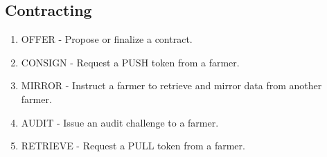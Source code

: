 \documentclass[a4paper,10pt]{article}
\begin{document}
\subsection{Contracting}
\begin{enumerate}
\setcounter{enumi}{\theenumTemp}
\item OFFER - Propose or finalize a contract.
\item CONSIGN - Request a PUSH token from a farmer.
\item MIRROR - Instruct a farmer to retrieve and mirror data from another
farmer.
\item AUDIT - Issue an audit challenge to a farmer.
\item RETRIEVE - Request a PULL token from a farmer.
\end{enumerate}


\newpage

\begingroup
  \raggedright
  
\endgroup
\end{document}
